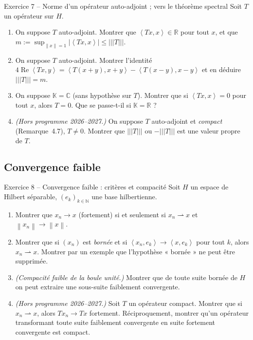 \documentclass[11pt,a4paper]{article}
\newcommand{\R}{\mathbb{R}}
\newcommand{\N}{\mathbb{N}}
\newcommand{\C}{\mathbb{C}}
\newcommand{\K}{\mathbb{K}}
\newcommand{\norm}[1]{\left\|#1\right\|}
\newcommand{\opnorm}[1]{|\!|\!|#1|\!|\!|}
\newcommand{\ps}[2]{\left\langle #1,#2\right\rangle}
\renewcommand{\Re}{\operatorname{Re}}
\theoremstyle{definition}
\begin{document}
\begin{exo}{Exercice 7 -- Norme d'un opérateur auto-adjoint ; vers le théorème spectral}
Soit $T$ un opérateur sur $H$.
\begin{enumerate}[label=(\alph*)]
  \item On suppose $T$ auto-adjoint. Montrer que $\ps{Tx}x\in\R$ pour tout $x$, et que $m:=\sup_{\norm x=1}|\ps{Tx}x|\le\opnorm T$.
  \item On suppose $T$ auto-adjoint. Montrer l'identité $4\Re\ps{Tx}y=\ps{T(x+y)}{x+y}-\ps{T(x-y)}{x-y}$ et en déduire $\opnorm T=m$.
  \item On suppose $\K=\C$ (sans hypothèse sur $T$). Montrer que si $\ps{Tx}x=0$ pour tout $x$, alors $T=0$. Que se passe-t-il si $\K=\R$ ?
  \item \emph{(Hors programme 2026--2027.)} On suppose $T$ auto-adjoint et \emph{compact} (Remarque~4.7), $T\ne0$. Montrer que $\opnorm T$ ou $-\opnorm T$ est une valeur propre de $T$.
\end{enumerate}
\end{exo}

\subsection*{Convergence faible}

\begin{exo}{Exercice 8 -- Convergence faible : critères et compacité}
Soit $H$ un espace de Hilbert séparable, $(e_k)_{k\in\N}$ une base hilbertienne.
\begin{enumerate}[label=(\alph*)]
  \item Montrer que $x_n\to x$ (fortement) si et seulement si $x_n\rightharpoonup x$ et $\norm{x_n}\to\norm x$.
  \item Montrer que si $(x_n)$ est \emph{bornée} et si $\ps{x_n}{e_k}\to\ps x{e_k}$ pour tout $k$, alors $x_n\rightharpoonup x$. Montrer par un exemple que l'hypothèse « bornée » ne peut être supprimée.
  \item \emph{(Compacité faible de la boule unité.)} Montrer que de toute suite bornée de $H$ on peut extraire une sous-suite faiblement convergente.
  \item \emph{(Hors programme 2026--2027.)} Soit $T$ un opérateur compact. Montrer que si $x_n\rightharpoonup x$, alors $Tx_n\to Tx$ fortement. Réciproquement, montrer qu'un opérateur transformant toute suite faiblement convergente en suite fortement convergente est compact.
\end{enumerate}
\end{exo}
\end{document}
